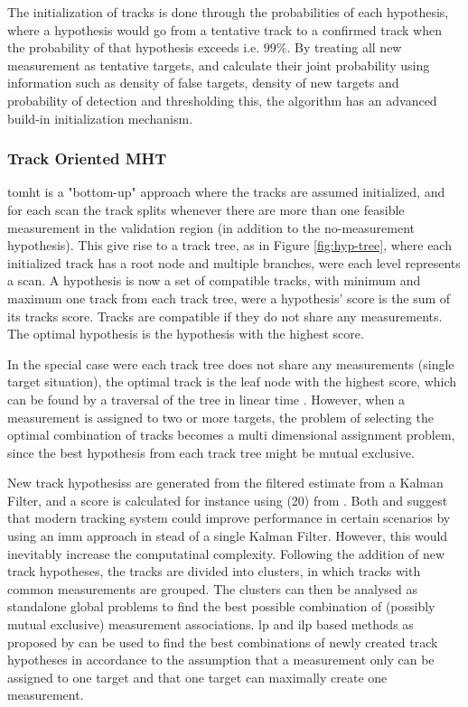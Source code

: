 The initialization of tracks is done through the probabilities of each hypothesis, where a hypothesis would go from a tentative track to a confirmed track when the probability of that hypothesis exceeds i.e. $99 \%$. By treating all new \gls{measurement} as tentative \glspl{target}, and calculate their joint probability using information such as density of false \glspl{target}, density of new \glspl{target} and probability of detection and thresholding this, the algorithm has an advanced build-in initialization mechanism.

\subsubsection{Track Oriented MHT}
\label{subsec:tomht}
\gls{tomht} is a "bottom-up" approach where the tracks are assumed initialized, and for each scan the track splits whenever there are more than one feasible \gls{measurement} in the validation region (in addition to the \gls{no-measurement hypothesis}). This give rise to a track tree, as in Figure \ref{fig:hyp-tree}, where each initialized track has a root node and multiple branches, were each level represents a scan. A hypothesis is now a set of compatible tracks, with minimum and maximum one track from each track tree, were a hypothesis' \gls{score} is the sum of its \glspl{track} \gls{score}. Tracks are compatible if they do not share any \glspl{measurement}. The optimal hypothesis is the hypothesis with the highest \gls{score}.

In the special case were each track tree does not share any \glspl{measurement} (single \gls{target} situation), the optimal track is the leaf node with the highest \gls{score}, which can be found by a traversal of the tree in linear time \cite{Tarjan1971}. However, when a \gls{measurement} is assigned to two or more \glspl{target}, the problem of selecting the optimal combination of tracks becomes a multi dimensional assignment problem, since the best hypothesis from each track tree might be mutual exclusive.

New \glspl{track hypothesis} are generated from the filtered estimate from a Kalman Filter, and a \gls{score} is calculated for instance using (20) from \cite{Bar-Shalom2007}. Both \cite{Bar-Shalom2007} and  \cite{Blackman2004} suggest that modern tracking system could improve performance in certain scenarios by using an \gls{imm} approach in stead of a single Kalman Filter. However, this would inevitably increase the computatinal complexity. Following the addition of new track hypotheses, the tracks are divided into clusters, in which tracks with common \glspl{measurement} are grouped. The clusters can then be analysed as standalone global problems to find the best possible combination of (possibly mutual exclusive) \gls{measurement} associations. \gls{lp} and \gls{ilp} based methods as proposed by \cite{Storms2003} can be used to find the best combinations of newly created track hypotheses in accordance to the assumption that a \gls{measurement} only can be assigned to one \gls{target} and that one \gls{target} can maximally create one \gls{measurement}.

